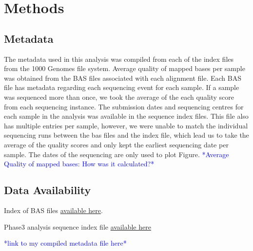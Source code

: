 \documentclass[9pt,lineno]{elife}
\newcommand{\todo}[1]{\textcolor{blue}{*#1*}}
\begin{document}
\section{Methods}
\subsection{Metadata}
The metadata used in this analysis was compiled from each of the index files from the 1000 Genomes file system. 
Average quality of mapped bases per sample was obtained from the BAS files associated with each alignment file. 
Each BAS file has metadata regarding each sequencing event for each sample. 
If a sample was sequenced more than once, we took the average of the each quality score from each sequencing instance. 
The submission dates and sequencing centres for each sample in the analysis was available in the sequence index files.  
This file also has multiple entries per sample, however, we were unable to match the individual sequencing runs between the bas files and the index file, which lead us to take the average of the quality scores and only kept the earliest sequencing date per sample. 
The dates of the sequencing are only used to plot Figure. \todo{Average Quality of mapped bases: How was it calculated?}

\subsection{Data Availability}

Index of BAS files \href{http://ftp.1000genomes.ebi.ac.uk/vol1/ftp/data_collections/1000_genomes_project/1000genomes.low_coverage.GRCh38DH.alignment.index}{available here}.

Phase3 analysis sequence index file  \href{http://ftp.1000genomes.ebi.ac.uk/vol1/ftp/phase3/20130502.phase3.analysis.sequence.index}{available here} 

\todo{link to my compiled metadata file here}
\end{document}
